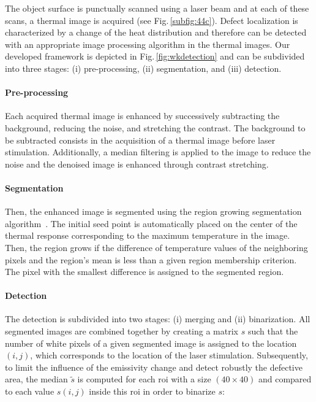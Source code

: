 \documentclass[12pt]{spieman}
\begin{document}
\begin{spacing}{2}
%

The object surface is punctually scanned using a laser beam and at each of these scans, a thermal image is acquired (see Fig.\,\ref{subfig:44c}).
Defect localization is characterized by a change of the heat distribution and therefore can be detected with an appropriate image processing algorithm in the thermal images.
Our developed framework is depicted in Fig.\,\ref{fig:wkdetection} and can be subdivided into three stages: (i) pre-processing, (ii) segmentation, and (iii) detection.

\paragraph{Pre-processing} Each acquired thermal image is enhanced by successively subtracting the background, reducing the noise, and stretching the contrast. The background to be subtracted consists in the acquisition of a thermal image before laser stimulation. Additionally, a median filtering is applied to the image to reduce the noise and the denoised image is enhanced through contrast stretching.
\paragraph{Segmentation} Then, the enhanced image is segmented using the region growing segmentation algorithm~\cite{Adams1994}. 
The initial seed point is automatically placed on the center of the thermal response corresponding to the maximum temperature in the image.
Then, the region grows if the difference of temperature values of the neighboring pixels and the region's mean is less than a given region membership criterion.
The pixel with the smallest difference is assigned to the segmented region.
\paragraph{Detection} The detection is subdivided into two stages: (i) merging and (ii) binarization.
All segmented images are combined together by creating a matrix $s$ such that the number of white pixels of a given segmented image is assigned to the location $(i,j)$, which corresponds to the location of the laser stimulation.
Subsequently, to limit the influence of the emissivity change and detect robustly the defective area, the median $\tilde{s}$ is computed for each \ac{roi} with a size $(40\times40)$ and compared to each value $s(i,j)$ inside this \ac{roi} in order to binarize $s$:


\end{spacing}
\end{document}
